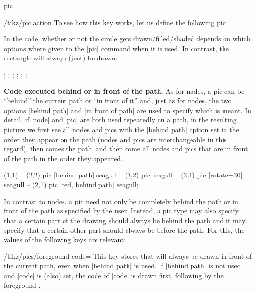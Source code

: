 \begin{pathoperation}{pic}{%
    }
\begin{key}{/tikz/pic action}
    To see how this key works, let us define the following pic:
\begin{codeexample}
\end{codeexample}
    In the code, whether or not the circle gets drawn/filled/shaded
    depends on which options where given to the |pic| command when it
    is used. In contrast, the rectangle will always (just) be drawn.
\begin{codeexample}[width=6cm]
\tikz {}; \space
\tikz {}; \space
\tikz {}; \space
\tikz {}; \space
\tikz {}; \space
\tikz {};
\end{codeexample}
  \end{key}
  
  \medskip
  \textbf{Code executed behind or in front of the path.}
  As for nodes, a pic can be ``behind'' the current path or ``in front
  of it'' and, just as for nodes, the two options |behind path| and
  |in front of path| are used to specify which is meant. In detail, if
  |node| and |pic| are both used repeatedly on a path, in the
  resulting picture we first see all nodes and pics with the
  |behind path| option set in the order they appear on the path (nodes
  and pics are interchangeable in this regard), then comes the path,
  and then come all nodes and pics that are in front of the path in
  the order they appeared.
\begin{codeexample}[]
\tikz \fill [fill=blue!20]
     (1,1)
  -- (2,2) pic [behind path]      {seagull}
  -- (3,2) pic                    {seagull}
  -- (3,1) pic [rotate=30]        {seagull}
  -- (2,1) pic [red, behind path] {seagull};
\end{codeexample}
  In contrast to nodes, a pic need not only be completely behind
  the path or in front of the path as specified by the user. Instead,
  a pic type may also specify that a certain part of the drawing
  should always be behind the path and it may specify that a certain
  other part should always be before the path. For this, the values of
  the following keys are relevant:
  
  \begin{key}{/tikz/pics/foreground code=}
    This key stores  that will always be drawn in front of
    the current path, even when |behind path| is used. If
    |behind path| is not used and |code| is (also) set, the code of
    |code| is 
    drawn first, following by the foreground .
  \end{key}
  

\end{pathoperation}
